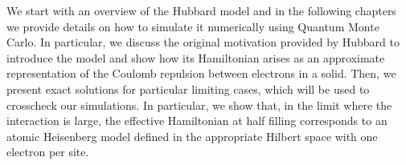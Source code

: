 
\label{cap:hubbard}

\slshape

We start with an overview of the Hubbard model and in the following chapters we provide details on how to simulate it numerically using Quantum Monte Carlo. In particular, we discuss the original motivation provided by Hubbard to introduce the model and show how its Hamiltonian arises as an approximate representation of the Coulomb repulsion between electrons in a solid. Then, we present exact solutions for particular limiting cases, which will be used to crosscheck our simulations. In particular, we show that, in the limit where the interaction is large, the effective Hamiltonian at half filling corresponds to an atomic Heisenberg model defined in the appropriate Hilbert space with one electron per site.

\normalfont






\cleardoublepage
